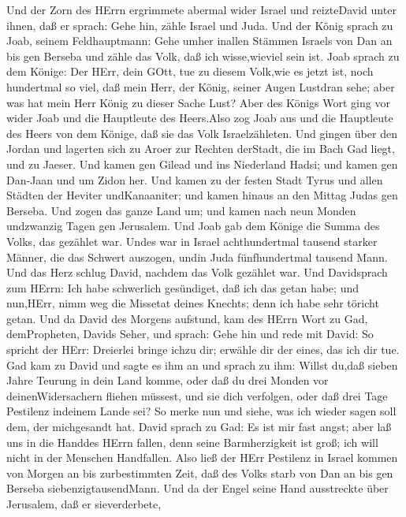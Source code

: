  Und der Zorn des HErrn ergrimmete abermal wider Israel und
reizteDavid unter ihnen, daß er sprach: Gehe hin, zähle Israel und Juda.
 Und der König sprach zu Joab, seinem Feldhauptmann: Gehe
umher inallen Stämmen Israels von Dan an bis gen Berseba und zähle das
Volk, daß ich wisse,wieviel sein ist.  Joab sprach zu dem
Könige: Der HErr, dein GOtt, tue zu diesem Volk,wie es jetzt ist, noch
hundertmal so viel, daß mein Herr, der König, seiner Augen Lustdran
sehe; aber was hat mein Herr König zu dieser Sache Lust? 
Aber des Königs Wort ging vor wider Joab und die Hauptleute des
Heers.Also zog Joab aus und die Hauptleute des Heers von dem Könige, daß
sie das Volk Israelzähleten.  Und gingen über den Jordan und
lagerten sich zu Aroer zur Rechten derStadt, die im Bach Gad liegt, und
zu Jaeser.  Und kamen gen Gilead und ins Niederland Hadsi;
und kamen gen Dan-Jaan und um Zidon her.  Und kamen zu der
festen Stadt Tyrus und allen Städten der Heviter undKanaaniter; und
kamen hinaus an den Mittag Judas gen Berseba.  Und zogen das
ganze Land um; und kamen nach neun Monden undzwanzig Tagen gen
Jerusalem.  Und Joab gab dem Könige die Summa des Volks, das
gezählet war. Undes war in Israel achthundertmal tausend starker Männer,
die das Schwert auszogen, undin Juda fünfhundertmal tausend Mann.
 Und das Herz schlug David, nachdem das Volk gezählet war.
Und Davidsprach zum HErrn: Ich habe schwerlich gesündiget, daß ich das
getan habe; und nun,HErr, nimm weg die Missetat deines Knechts; denn ich
habe sehr töricht getan.  Und da David des Morgens
aufstund, kam des HErrn Wort zu Gad, demPropheten, Davids Seher, und
sprach:  Gehe hin und rede mit David: So spricht der HErr:
Dreierlei bringe ichzu dir; erwähle dir der eines, das ich dir tue.
 Gad kam zu David und sagte es ihm an und sprach zu ihm:
Willst du,daß sieben Jahre Teurung in dein Land komme, oder daß du drei
Monden vor deinenWidersachern fliehen müssest, und sie dich verfolgen,
oder daß drei Tage Pestilenz indeinem Lande sei? So merke nun und siehe,
was ich wieder sagen soll dem, der michgesandt hat.  David
sprach zu Gad: Es ist mir fast angst; aber laß uns in die Handdes HErrn
fallen, denn seine Barmherzigkeit ist groß; ich will nicht in der
Menschen Handfallen.  Also ließ der HErr Pestilenz in
Israel kommen von Morgen an bis zurbestimmten Zeit, daß des Volks starb
von Dan an bis gen Berseba siebenzigtausendMann.  Und da
der Engel seine Hand ausstreckte über Jerusalem, daß er sieverderbete,
